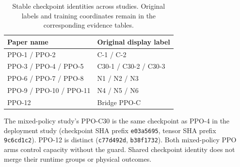 \begin{table}[t]
\centering\small
\caption{Stable checkpoint identities across studies. Original labels and
training coordinates remain in the corresponding evidence tables.}
\label{tab:displaycheckpoint}
\par\vspace{4pt}
\begin{tabular*}{\linewidth}{@{\extracolsep{\fill}}ll@{}}
\toprule
Paper name & Original display label\\
\midrule
PPO-1 / PPO-2 & C-1 / C-2\\
PPO-3 / PPO-4 / PPO-5 & C30-1 / C30-2 / C30-3\\
PPO-6 / PPO-7 / PPO-8 & N1 / N2 / N3\\
PPO-9 / PPO-10 / PPO-11 & N4 / N5 / N6\\
PPO-12 & Bridge PPO-C\\
\bottomrule
\end{tabular*}
\end{table}
The mixed-policy study's PPO-C30 is the same checkpoint as PPO-4 in the
deployment study (checkpoint SHA prefix \texttt{e03a5695}, tensor SHA prefix
\texttt{9c6cd1c2}). PPO-12 is distinct (\texttt{c77d492d},
\texttt{b38f1732}). Both mixed-policy PPO arms control capacity without the
guard. Shared checkpoint identity does not merge their runtime groups or
physical outcomes.
